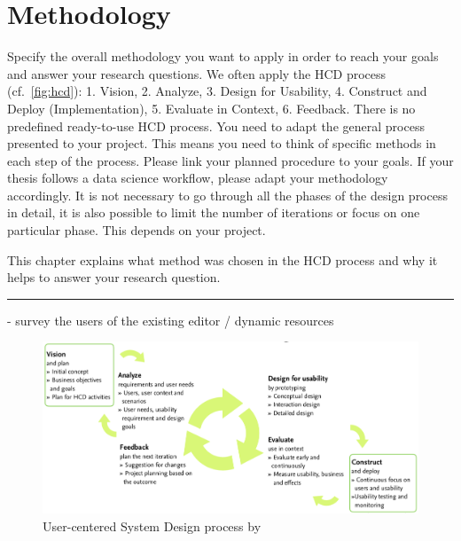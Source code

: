 \section{Methodology}
\label{subsec:methodology}
Specify the overall methodology you want to apply in order to reach your goals and answer your research questions. We often apply the HCD process (cf.~\autoref{fig:hcd}): 1. Vision, 2. Analyze, 3. Design for Usability, 4. Construct and Deploy (Implementation), 5. Evaluate in Context, 6. Feedback. There is no predefined ready-to-use HCD process. You need to adapt the general process presented to your project. This means you need to think of specific methods in each step of the process. Please link your planned procedure to your goals. If your thesis follows a data science workflow, please adapt your methodology accordingly. It is not necessary to go through all the phases of the design process in detail, it is also possible to limit the number of iterations or focus on one particular phase. This depends on your project.

This chapter explains what method was chosen in the HCD process and why it helps to answer your research question.

\hrule
- survey the users of the existing editor / dynamic resources


\begin{figure}[h]
  \centering
  \includegraphics[width=\linewidth]{pics/hcd.png}
  \caption{User-centered System Design process by~\cite{gulliksenKeyPrinciplesUsercentred2003}}
\end{figure}

